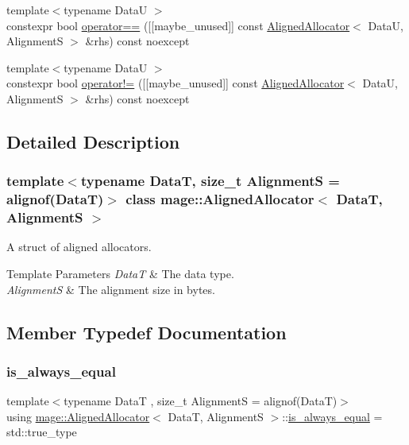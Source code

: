 \begin{DoxyCompactItemize}
\item 
{\footnotesize template$<$typename DataU $>$ }\\constexpr bool \hyperlink{classmage_1_1_aligned_allocator_a4f3c027b1f57bce8d2160b65eee8e49c}{operator==} (\mbox{[}\mbox{[}maybe\+\_\+unused\mbox{]}\mbox{]} const \hyperlink{classmage_1_1_aligned_allocator}{Aligned\+Allocator}$<$ DataU, AlignmentS $>$ \&rhs) const noexcept
\item 
{\footnotesize template$<$typename DataU $>$ }\\constexpr bool \hyperlink{classmage_1_1_aligned_allocator_a8b5b06229a4fec7804e1b0f979ba21d5}{operator!=} (\mbox{[}\mbox{[}maybe\+\_\+unused\mbox{]}\mbox{]} const \hyperlink{classmage_1_1_aligned_allocator}{Aligned\+Allocator}$<$ DataU, AlignmentS $>$ \&rhs) const noexcept
\end{DoxyCompactItemize}


\subsection{Detailed Description}
\subsubsection*{template$<$typename DataT, size\+\_\+t AlignmentS = alignof(\+Data\+T)$>$\newline
class mage\+::\+Aligned\+Allocator$<$ Data\+T, Alignment\+S $>$}

A struct of aligned allocators.


\begin{DoxyTemplParams}{Template Parameters}
{\em DataT} & The data type. \\
\hline
{\em AlignmentS} & The alignment size in bytes. \\
\hline
\end{DoxyTemplParams}


\subsection{Member Typedef Documentation}
\hypertarget{classmage_1_1_aligned_allocator_a7733565bae4efdc332035461bc307df8}{}\label{classmage_1_1_aligned_allocator_a7733565bae4efdc332035461bc307df8} 
\subsubsection{\texorpdfstring{is\+\_\+always\+\_\+equal}{is\_always\_equal}}
{\footnotesize\ttfamily template$<$typename DataT , size\+\_\+t AlignmentS = alignof(\+Data\+T)$>$ \\
using \hyperlink{classmage_1_1_aligned_allocator}{mage\+::\+Aligned\+Allocator}$<$ DataT, AlignmentS $>$\+::\hyperlink{classmage_1_1_aligned_allocator_a7733565bae4efdc332035461bc307df8}{is\+\_\+always\+\_\+equal} =  std\+::true\+\_\+type}

